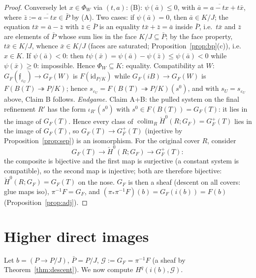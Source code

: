 \documentclass[11pt]{article}
\theoremstyle{definition}
\newcommand{\colim}{\operatorname*{colim}}
\newcommand{\HH}{\check{H}}
\begin{document}
\begin{proof}
Conversely let $x\in\Phi_W$ via $(t,a)$: (B): $\psi(\bar a)\le0$,
with $\bar a=\overline{a-tx}+t\bar x$, where
$\bar z:=\overline{a-tx}\in\bar P$ by (A). Two cases: if
$\psi(\bar a)=0$, then $\bar a\in K/J$; the equation
$t\bar x=\bar a-\bar z$ with $\bar z\in\bar P$ is an equality
$t\bar x+\bar z=\bar a$ inside $\bar P$, i.e.\ $t\bar x$ and
$\bar z$ are elements of $\bar P$ whose sum lies in the face
$K/J\subseteq\bar P$; by the face property, $t\bar x\in K/J$,
whence $\bar x\in K/J$ (faces are saturated;
Proposition~\ref{prop:bp}(c)), i.e.\ $x\in K$. If
$\psi(\bar a)<0$: then
$t\psi(\bar x)=\psi(\bar a)-\psi(\bar z)\le\psi(\bar a)<0$ while
$\psi(\bar x)\ge0$: impossible. Hence
$\Phi_W\subseteq K$: equality.
Compatibility at $W$: $G_F(\mathfrak f_{\varepsilon_U})\to G_F(W)$
is $F(\mathrm{id}_{P/K})$ while $G_F(iB)\to G_F(W)$ is
$F(B(T)\twoheadrightarrow P/K)$; hence
$s_{\varepsilon_U}=F(B(T)\twoheadrightarrow P/K)(s^0)$, and with
$s_U=s_{\varepsilon_U}$ above, Claim B follows.
\emph{Endgame.} Claim A+B: the pulled system on the final refinement
$R'$ has the form $\iota_{R'}(s^0)$ with $s^0\in F(B(T))=G_F(T)$: it
lies in the image of $G_F(T)$. Hence every class of
$\colim_R\HH^0(R;G_F)=G_F^+(T)$ lies in the image of $G_F(T)$, so
$G_F(T)\to G_F^+(T)$ (injective by Proposition~\ref{prop:sep}) is an
isomorphism. For the original cover $R$, consider
\[
G_F(T)\longrightarrow\HH^0(R;G_F)\longrightarrow G_F^+(T):
\]
the composite is bijective and the first map is surjective (a
constant system is compatible), so the second map is injective; both
are therefore bijective: $\HH^0(R;G_F)=G_F(T)$ on the nose.
$G_F$ is then a sheaf (descent on all covers: glue maps iso),
$\pi^{-1}F=G_F$, and $(\pi_*\pi^{-1}F)(b)=G_F(i(b))=F(b)$
(Proposition~\ref{prop:adj}).
\end{proof}



\section{Higher direct images}\label{sec:direct}

Let $b=(P\to P/J)$, $\bar P=P/J$, $\mathcal G:=G_F=\pi^{-1}F$ (a
sheaf by Theorem~\ref{thm:descent}). We now compute
$H^q(i(b),\mathcal G)$.
\end{document}
